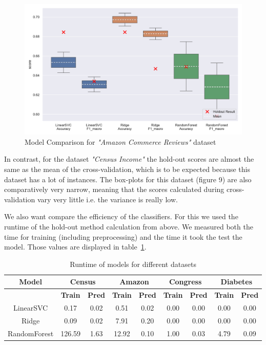 \documentclass[a4paper,10pt]{article}
\begin{document}
\begin{figure}[h!]
\centering
\includegraphics[width=\textwidth]{amazon/plots/model_comparison.pdf}
\caption{Model Comparison for \textit{"Amazon Commerce Reviews"} dataset}
\label{fig:model_comparison amazon}
\end{figure}





In contrast, for the dataset 
\textit{"Census Income"} the hold-out scores are almost the same as the mean of the cross-validation, which is to be
expected because this dataset has a lot of instances. The box-plots for this dataset (figure 9) are also
comparatively very narrow, meaning that the scores calculated during cross-validation vary very little i.e.
the variance is really low.




We also want compare the efficiency of the classifiers. For this we used the runtime of the hold-out
method calculation from above. We measured both the time for training (including preprocessing) and
the time it took the test the model. Those values are displayed in table~\ref{tab:runtime_models}.


\begin{table}[h!]
\centering
\footnotesize
\begin{tabular}{|c|c|c|c|c|c|c|c|c|}
\hline
\textbf{Model} & \multicolumn{2}{c|}{Census} & \multicolumn{2}{c|}{Amazon} & \multicolumn{2}{c|}{Congress} & \multicolumn{2}{c|}{Diabetes} \\
\hline
& \textbf{Train} & \textbf{Pred} & \textbf{Train} & \textbf{Pred} & \textbf{Train} & \textbf{Pred} & \textbf{Train} & \textbf{Pred} \\
\hline
LinearSVC & 0.17 & 0.02 & 0.51 & 0.02 & 0.00 & 0.00 & 0.00 & 0.00 \\
\hline
Ridge & 0.09 & 0.02 & 7.91 & 0.20 & 0.00 & 0.00 & 0.00 & 0.00 \\
\hline
RandomForest & 126.59 & 1.63 & 12.92 & 0.10 & 1.00 & 0.03 & 4.79 & 0.09 \\
\hline
\end{tabular}
\vspace{0.3cm}
\caption{Runtime of models for different datasets}
\label{tab:runtime_models}
\end{table}
\end{document}
